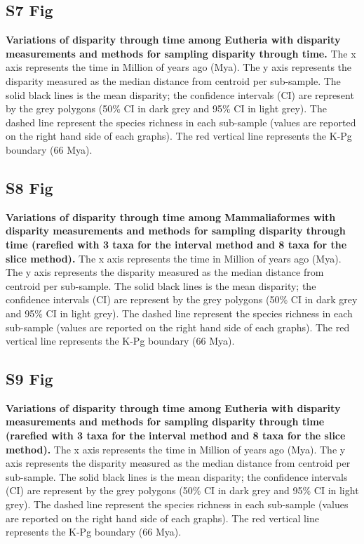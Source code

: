 \documentclass[10pt,letterpaper]{article}
\begin{document}
\subsection*{S7 Fig}
\label{S7_Fig}
{\bf Variations of disparity through time among Eutheria with disparity measurements and methods for sampling disparity through time.} The x axis represents the time in Million of years ago (Mya). The y axis represents the disparity measured as the median distance from centroid per sub-sample. The solid black lines is the mean disparity; the confidence intervals (CI) are represent by the grey polygons (50\% CI in dark grey and 95\% CI in light grey). The dashed line represent the species richness in each sub-sample (values are reported on the right hand side of each graphs). The red vertical line represents the K-Pg boundary (66 Mya).

\subsection*{S8 Fig}
\label{S8_Fig}
{\bf Variations of disparity through time among Mammaliaformes with disparity measurements and methods for sampling disparity through time (rarefied with 3 taxa for the interval method and 8 taxa for the slice method).} The x axis represents the time in Million of years ago (Mya). The y axis represents the disparity measured as the median distance from centroid per sub-sample. The solid black lines is the mean disparity; the confidence intervals (CI) are represent by the grey polygons (50\% CI in dark grey and 95\% CI in light grey). The dashed line represent the species richness in each sub-sample (values are reported on the right hand side of each graphs). The red vertical line represents the K-Pg boundary (66 Mya).

\subsection*{S9 Fig}
\label{S9_Fig}
{\bf Variations of disparity through time among Eutheria with disparity measurements and methods for sampling disparity through time (rarefied with 3 taxa for the interval method and 8 taxa for the slice method).} The x axis represents the time in Million of years ago (Mya). The y axis represents the disparity measured as the median distance from centroid per sub-sample. The solid black lines is the mean disparity; the confidence intervals (CI) are represent by the grey polygons (50\% CI in dark grey and 95\% CI in light grey). The dashed line represent the species richness in each sub-sample (values are reported on the right hand side of each graphs). The red vertical line represents the K-Pg boundary (66 Mya).
\end{document}
